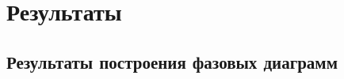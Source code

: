 %
\section{Результаты}
\label{PRIMe-SecResults}

\subsection{Результаты построения фазовых диаграмм}
\label{PRIMe-SubSecPhaseDiagramMD}

